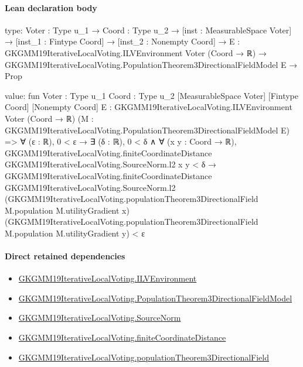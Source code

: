 \documentclass[10pt]{article}
\begin{document}
\paragraph{Lean declaration body}
\begin{ReviewVerbatim}
type:
{Voter : Type u_1} →
  {Coord : Type u_2} →
    [inst : MeasurableSpace Voter] →
      [inst_1 : Fintype Coord] →
        [inst_2 : Nonempty Coord] →
          {E : GKGMM19IterativeLocalVoting.ILVEnvironment Voter (Coord → ℝ)} →
            GKGMM19IterativeLocalVoting.PopulationTheorem3DirectionalFieldModel E → Prop

value:
fun {Voter : Type u_1} {Coord : Type u_2} [MeasurableSpace Voter] [Fintype Coord] [Nonempty Coord]
    {E : GKGMM19IterativeLocalVoting.ILVEnvironment Voter (Coord → ℝ)}
    (M : GKGMM19IterativeLocalVoting.PopulationTheorem3DirectionalFieldModel E) =>
  ∀ (ε : ℝ),
    0 < ε →
      ∃ (δ : ℝ),
        0 < δ ∧
          ∀ (x y : Coord → ℝ),
            GKGMM19IterativeLocalVoting.finiteCoordinateDistance GKGMM19IterativeLocalVoting.SourceNorm.l2 x y < δ →
              GKGMM19IterativeLocalVoting.finiteCoordinateDistance GKGMM19IterativeLocalVoting.SourceNorm.l2
                  (GKGMM19IterativeLocalVoting.populationTheorem3DirectionalField M.population M.utilityGradient x)
                  (GKGMM19IterativeLocalVoting.populationTheorem3DirectionalField M.population M.utilityGradient y) <
                ε
\end{ReviewVerbatim}

\paragraph{Direct retained dependencies}
\begin{itemize}\raggedright
\item \hyperlink{governing-declaration-df2ca62df1846667}{GKGMM19\allowbreak{}Iterative\allowbreak{}Local\allowbreak{}Voting.\allowbreak{}ILV\allowbreak{}Environment}
\item \hyperlink{governing-declaration-30327078fcfa0789}{GKGMM19\allowbreak{}Iterative\allowbreak{}Local\allowbreak{}Voting.\allowbreak{}Population\allowbreak{}Theorem3\allowbreak{}Directional\allowbreak{}Field\allowbreak{}Model}
\item \hyperlink{governing-declaration-6fa4ab9852321b03}{GKGMM19\allowbreak{}Iterative\allowbreak{}Local\allowbreak{}Voting.\allowbreak{}Source\allowbreak{}Norm}
\item \hyperlink{governing-declaration-54228ebaec750c58}{GKGMM19\allowbreak{}Iterative\allowbreak{}Local\allowbreak{}Voting.\allowbreak{}finite\allowbreak{}Coordinate\allowbreak{}Distance}
\item \hyperlink{governing-declaration-2aecbc804ca585b9}{GKGMM19\allowbreak{}Iterative\allowbreak{}Local\allowbreak{}Voting.\allowbreak{}population\allowbreak{}Theorem3\allowbreak{}Directional\allowbreak{}Field}
\end{itemize}
\hypertarget{governing-declaration-f172e1201669c9b1}{}
\end{document}
